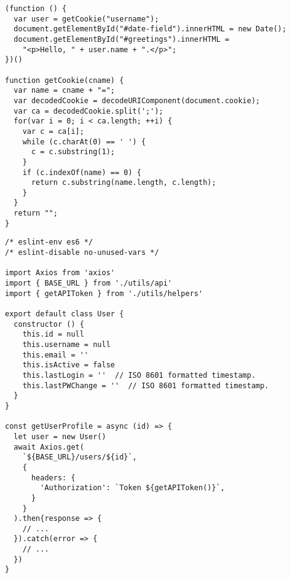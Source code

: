 \documentclass[10pt]{article}
\begin{document}
\begin{lstlisting}[style=JavaScript, caption={JavaScript Listing}]
(function () {
  var user = getCookie("username");
  document.getElementById("#date-field").innerHTML = new Date();
  document.getElementById("#greetings").innerHTML =
    "<p>Hello, " + user.name + ".</p>";
})()

function getCookie(cname) {
  var name = cname + "=";
  var decodedCookie = decodeURIComponent(document.cookie);
  var ca = decodedCookie.split(';');
  for(var i = 0; i < ca.length; ++i) {
    var c = ca[i];
    while (c.charAt(0) == ' ') {
      c = c.substring(1);
    }
    if (c.indexOf(name) == 0) {
      return c.substring(name.length, c.length);
    }
  }
  return "";
}
\end{lstlisting}

\newpage

\begin{lstlisting}[style=ES6, caption={ES6 (ECMAScript-2015) Listing}]
/* eslint-env es6 */
/* eslint-disable no-unused-vars */

import Axios from 'axios'
import { BASE_URL } from './utils/api'
import { getAPIToken } from './utils/helpers'

export default class User {
  constructor () {
    this.id = null
    this.username = null
    this.email = ''
    this.isActive = false
    this.lastLogin = ''  // ISO 8601 formatted timestamp.
    this.lastPWChange = ''  // ISO 8601 formatted timestamp.
  }
}

const getUserProfile = async (id) => {
  let user = new User()
  await Axios.get(
    `${BASE_URL}/users/${id}`,
    {
      headers: {
        'Authorization': `Token ${getAPIToken()}`,
      }
    }
  ).then{response => {
    // ...
  }).catch(error => {
    // ...
  })
}
\end{lstlisting}
\end{document}
